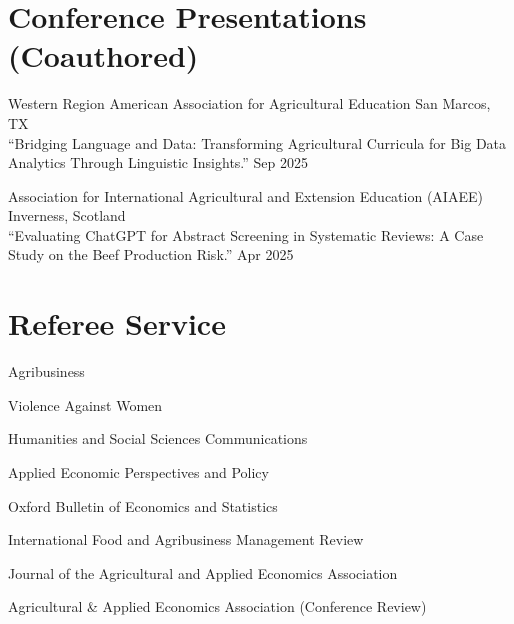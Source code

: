 \documentclass[10.8 pt,letterpaper]{article}
\renewenvironment{itemize}{
	\begin{list}{}{
			\setlength{\leftmargin}{1.5em}
		}
	}{
	\end{list}
}
\begin{document}
	
	\section*{\textbf{Conference Presentations (Coauthored)}}
	
	\begin{itemize}
		
		\item[-] Western Region American Association for Agricultural Education \hfill San Marcos, TX \\
		``Bridging Language and Data: Transforming Agricultural Curricula for Big Data Analytics Through Linguistic Insights.'' \hfill Sep 2025
		
		\item[-] Association for International Agricultural and Extension Education (AIAEE) \hfill Inverness, Scotland \\
		``Evaluating ChatGPT for Abstract Screening in Systematic Reviews: A Case Study on the Beef Production Risk.'' \hfill Apr 2025
		
	\end{itemize}
	
	
	\section*{\textbf{Referee Service}}
	\begin{itemize}
		\item[-] Agribusiness
		\item[-] Violence Against Women
		\item[-] Humanities and Social Sciences Communications
		\item[-] Applied Economic Perspectives and Policy
		\item[-] Oxford Bulletin of Economics and Statistics
		\item[-] International Food and Agribusiness Management Review
		\item[-] Journal of the Agricultural and Applied Economics Association
		\item[-] Agricultural \& Applied Economics Association (Conference Review)
	\end{itemize}
	
\end{document}
